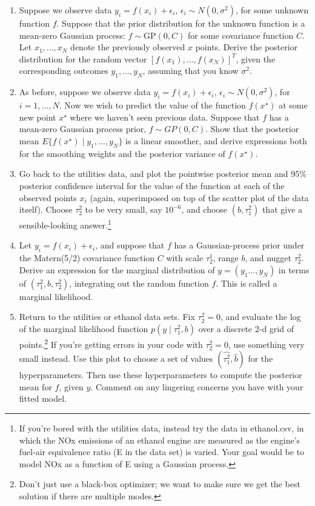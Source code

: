 \documentclass{homework}
\newcommand{\1}{\mathbf{1}}
\begin{document}
\begin{enumerate}[label=(\Alph*)]

\item Suppose we observe data $y_i = f(x_i) + \epsilon_i$, $\epsilon_i \sim N(0, \sigma^2)$, for some unknown function $f$. Suppose that the prior distribution for the unknown function is a mean-zero Gaussian process: $f \sim \mbox{GP}(0, C)$ for some covariance function $C$.  Let $x_1, \ldots, x_N$ denote the previously observed $x$ points.  Derive the posterior distribution for the random vector $[f(x_1), \ldots, f(x_N)]^T$, given the corresponding outcomes $y_1, \ldots, y_N$, assuming that you know $\sigma^2$.

\item As before, suppose we observe data $y_i = f(x_i) + \epsilon_i$, $\epsilon_i \sim N(0, \sigma^2)$, for $i=1, \ldots, N$.  Now we wish to predict the value of the function $f(x^{\star})$ at some new point $x^{\star}$ where we haven't seen previous data.  Suppose that $f$ has a mean-zero Gaussian process prior, $f \sim GP(0, C)$.  Show that the posterior mean $E\{ f(x^{\star}) \mid y_1, \ldots, y_N \}$ is a linear smoother, and derive expressions both for the smoothing weights and the posterior variance of $f(x^{\star})$.

\item Go back to the utilities data, and plot the pointwise posterior mean and 95\% posterior confidence interval for the value of the function at each of the observed points $x_i$ (again, superimposed on top of the scatter plot of the data itself).  Choose $\tau^2_2$ to be very small, say $10^{-6}$, and choose $(b, \tau^2_1)$ that give a sensible-looking answer.\footnote{If you're bored with the utilities data, instead try the data in ethanol.csv, in which the NOx emissions of an ethanol engine are measured as the engine's fuel-air equivalence ratio (E in the data set) is varied.  Your goal would be to model NOx as a function of E using a Gaussian process. }

\item Let $y_i = f(x_i) + \epsilon_i$, and suppose that $f$ has a Gaussian-process prior under the Matern(5/2) covariance function $C$ with scale $\tau^1_2$, range $b$, and nugget $\tau^2_2$.  Derive an expression for the marginal distribution of $y = (y_1 \ldots, y_N)$ in terms of $(\tau^2_1, b, \tau^2_2)$, integrating out the random function $f$.  This is called a marginal likelihood.

\item Return to the utilities or ethanol data sets. Fix $\tau^2_2 = 0$, and evaluate the log of the marginal likelihood function $p(y \mid \tau^2_1, b)$ over a discrete 2-d grid of points.\footnote{Don't just use a black-box optimizer; we want to make sure we get the best solution if there are multiple modes.} If you're getting errors in your code with $\tau^2_2 = 0$, use something very small instead.  Use this plot to choose a set of values $(\hat{\tau^2_1}, \hat{b})$ for the hyperparameters.  Then use these hyperparameters to compute the posterior mean for $f$, given $y$.  Comment on any lingering concerns you have with your fitted model.


\end{enumerate}
\end{document}
